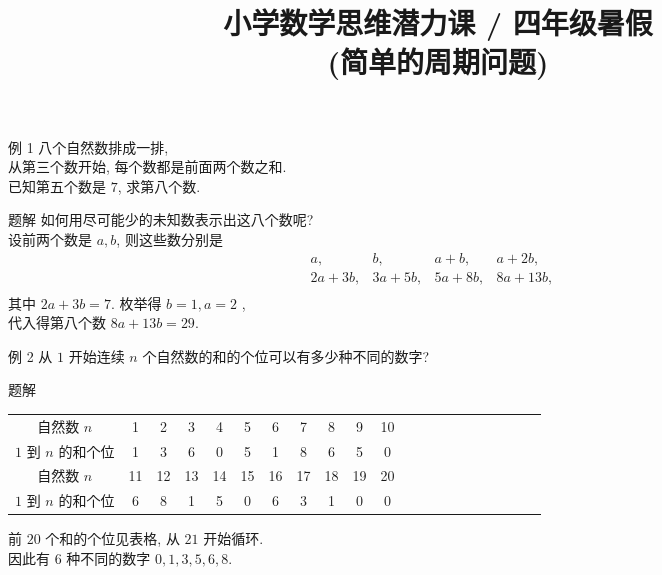 \documentclass[content.tex]{subfiles}
\title{小学数学思维潜力课 / 四年级暑假 \\ (简单的周期问题)}
\begin{document}
\begin{frame}
\maketitle
\end{frame}

\begin{frame}{例 1}
八个自然数排成一排, \\
从第三个数开始, 每个数都是前面两个数之和. \\
已知第五个数是 $7$, 求第八个数.
\begin{exampleblock}{题解}
如何用尽可能少的未知数表示出这八个数呢? \\
设前两个数是 $a,b$, 则这些数分别是 
$$
\begin{matrix}
a, & b, & a+b, & a+2b, &  \\
2a+3b, & 3a+5b, & 5a+8b, & 8a+13b, \\
\end{matrix}
$$
其中 $2a+3b=7$. 枚举得 $b = 1, a = 2$ , \\
代入得第八个数 $8a+13b=29$. 
\end{exampleblock}
\end{frame}

\begin{frame}{例 2}
从 $1$ 开始连续 $n$ 个自然数的和的个位可以有多少种不同的数字?
\begin{exampleblock}{题解}
\begin{tabular}{c|cccccccccccccccccccc}
自然数 $n$ & 1 & 2 & 3 & 4 & 5 & 6 & 7 & 8 & 9 & 10 \\
\footnotesize $1$ 到 $n$ 的和个位 & 
1 & 3 & 6 & 0 & 5 & 1 & 8 & 6 & 5 & 0 \\
\hline
自然数 $n$ & 11 & 12 & 13 & 14 & 15 & 16 & 17 & 18 & 19 & 20 \\
\footnotesize $1$ 到 $n$ 的和个位 & 
6 & 8 & 1 & 5 & 0 & 6 & 3 & 1 & 0 & 0 \\
\end{tabular}
\bigbreak
前 $20$ 个和的个位见表格, 从 $21$ 开始循环. \\
因此有 $6$ 种不同的数字 $0,1,3,5,6,8$.
\end{exampleblock}
\end{frame}
\end{document}

